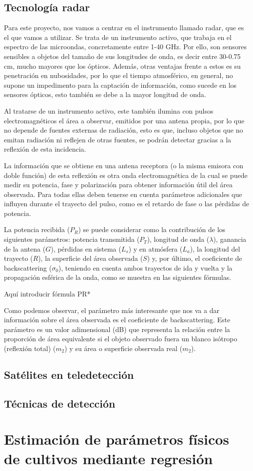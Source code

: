 \subsection{Tecnología radar}
\par Para este proyecto, nos vamos a centrar en el instrumento llamado radar, que es el que vamos a utilizar. Se trata de un instrumento activo, que trabaja en el espectro de las microondas, concretamente entre 1-40 GHz. Por ello, son sensores sensibles a objetos del tamaño de sus longitudes de onda, es decir entre 30-0.75 cm, mucho mayores que los ópticos. Además, otras ventajas frente a estos es su penetración en nubosidades, por lo que el tiempo atmosférico, en general, no supone un impedimento para la captación de información, como sucede en los sensores ópticos, esto también se debe a la mayor longitud de onda.
\\
\par Al tratarse de un instrumento activo, este también ilumina con pulsos electromagnéticos el área a observar, emitidos por una antena propia, por lo que no depende de fuentes externas de radiación, esto es que, incluso objetos que no emitan radiación ni reflejen de otras fuentes, se podrán detectar gracias a la reflexión de esta incidencia. 
\\ 
\par La información que se obtiene en una antena receptora (o la misma emisora con doble función) de esta reflexión es otra onda electromagnética de la cual se puede medir su potencia, fase y polarización para obtener información útil del área observada. Para todas ellas deben tenerse en cuenta parámetros adicionales que influyen durante el trayecto del pulso, como es el retardo de fase o las pérdidas de potencia. 
\\
\par La potencia recibida ($P_{R}$) se puede considerar como la contribución de los siguientes parámetros: potencia transmitida ($P_{T}$), longitud de onda ($\lambda$), ganancia de la antena ($G$), pérdidas en sistema ($L_{s}$) y en atmósfera ($L_{a}$), la longitud del trayecto ($R$), la superficie del área observada ($S$) y, por último, el coeficiente de backscattering ($\sigma_{0}$), teniendo en cuenta ambos trayectos de ida y vuelta y la propagación esférica de la onda, como se muestra en las siguientes fórmulas. 
\\
\par *Aquí introducir fórmula PR*
\\
\par Como podemos observar, el parámetro más interesante que nos va a dar información sobre el área observada es el coeficiente de backscattering. Este parámetro es un valor adimensional (dB) que representa la relación entre la proporción de área equivalente si el objeto observado fuera un blanco isótropo (reflexión total) ($m_{2}$) y su área o superficie observada real ($m_{2}$). 
\subsection{Satélites en teledetección}
\subsection{Técnicas de detección}
\section{Estimación de parámetros físicos de cultivos mediante regresión}
 